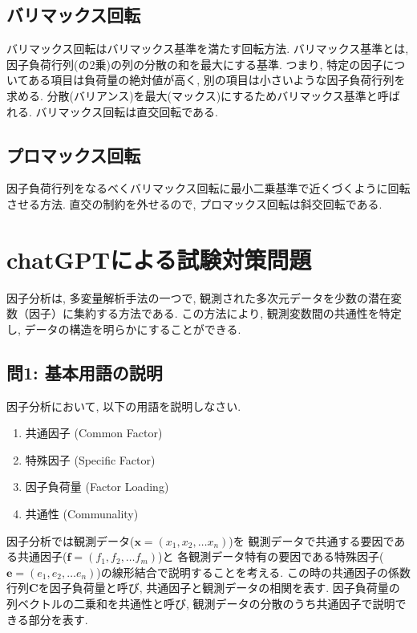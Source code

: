 \documentclass[dvipdfmx, 10pt]{jsarticle}
\begin{document}
\subsection*{バリマックス回転}
バリマックス回転はバリマックス基準を満たす回転方法. 
バリマックス基準とは, 因子負荷行列(の2乗)の列の分散の和を最大にする基準. 
つまり, 特定の因子についてある項目は負荷量の絶対値が高く, 別の項目は小さいような因子負荷行列を求める. 
分散(バリアンス)を最大(マックス)にするためバリマックス基準と呼ばれる. 
バリマックス回転は直交回転である. 

\subsection*{プロマックス回転}
因子負荷行列をなるべくバリマックス回転に最小二乗基準で近くづくように回転させる方法. 
直交の制約を外せるので, プロマックス回転は斜交回転である. 

\section*{chatGPTによる試験対策問題}

因子分析は, 多変量解析手法の一つで, 観測された多次元データを少数の潜在変数（因子）に集約する方法である. この方法により, 観測変数間の共通性を特定し, データの構造を明らかにすることができる. 

\subsection*{問1: 基本用語の説明}
因子分析において, 以下の用語を説明しなさい. 
\begin{enumerate}
    \item 共通因子 (Common Factor)
    \item 特殊因子 (Specific Factor)
    \item 因子負荷量 (Factor Loading)
    \item 共通性 (Communality)
\end{enumerate}

因子分析では観測データ(\(\mathbf{x} = (x_1, x_2, \dots x_n)\))を
観測データで共通する要因である共通因子(\(\mathbf{f} = (f_1, f_2, \dots f_m)\))と
各観測データ特有の要因である特殊因子(\(\mathbf{e} = (e_1, e_2, \dots e_n)\))の線形結合で説明することを考える. 
この時の共通因子の係数行列\(\mathbf{C}\)を因子負荷量と呼び, 共通因子と観測データの相関を表す. 
因子負荷量の列ベクトルの二乗和を共通性と呼び, 観測データの分散のうち共通因子で説明できる部分を表す. 
\end{document}
